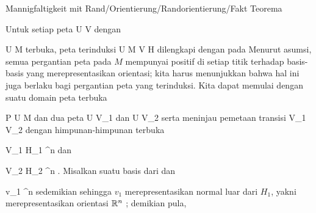 {Mannigfaltigkeit mit Rand/Orientierung/Randorientierung/Fakt}
{Teorema}
{}
{

\faktzusatz {}
\faktzusatz {}

}
{

Untuk setiap peta
 {} {}
\maabbdisp {\alpha} { U } { V
} {}
dengan

\mavergleichskette
{\vergleichskette
{ U
}
{ \subseteq }{ M
}
{  }{
}
{    }{
}
{   }{
}
}
{}{}{}
terbuka, peta terinduksi
\maabbdisp {} {U \cap \partial M } { V \cap \partial H
} {}
dilengkapi dengan
pada
 Menurut asumsi, semua pergantian peta pada $M$ mempunyai
positif di setiap titik terhadap basis-basis yang merepresentasikan orientasi; kita harus menunjukkan bahwa hal ini juga berlaku bagi pergantian peta yang terinduksi. Kita dapat memulai dengan suatu domain peta terbuka

\mavergleichskette
{\vergleichskette
{ P
}
{ \in }{ U
}
{ \subseteq }{ M
}
{    }{
}
{   }{
}
}
{}{}{}
dan dua peta
 { U } { V_1
} {}
dan
 { U } { V_2
} {}
serta meninjau pemetaan transisi
 { V_1 } { V_2
} {}
dengan himpunan-himpunan terbuka

\mavergleichskette
{\vergleichskette
{ V_1
}
{ \subseteq }{ H_1
}
{ \subset }{ \R^n
}
{    }{
}
{   }{
}
}
{}{}{}
dan

\mavergleichskette
{\vergleichskette
{ V_2
}
{ \subseteq }{ H_2
}
{ \subset }{ \R^n
}
{    }{
}
{   }{
}
}
{}{}{.}
Misalkan
 suatu basis dari
 dan

\mavergleichskette
{\vergleichskette
{ v_1
}
{ \in }{ \R^n
}
{  }{
}
{    }{
}
{   }{
}
}
{}{}{}
sedemikian sehingga $v_1$ merepresentasikan normal luar dari $H_1$, yakni
 merepresentasikan orientasi ${\mathbb R}^n$
 {} {;}
demikian pula,

}
